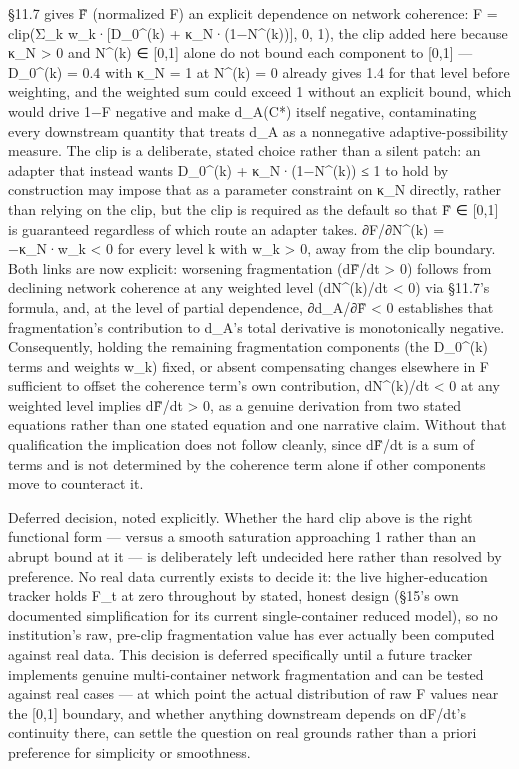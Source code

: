 \documentclass[
]{article}
\begin{document}
§11.7 gives F̃ (normalized F) an explicit dependence on network
coherence: F = clip(Σ\_k w\_k·{[}D\_0\^{}(k) + κ\_N·(1−N\^{}(k)){]}, 0,
1), the clip added here because κ\_N \textgreater{} 0 and N\^{}(k) ∈
{[}0,1{]} alone do not bound each component to {[}0,1{]} --- D\_0\^{}(k)
= 0.4 with κ\_N = 1 at N\^{}(k) = 0 already gives 1.4 for that level
before weighting, and the weighted sum could exceed 1 without an
explicit bound, which would drive 1−F negative and make d\_A(C*) itself
negative, contaminating every downstream quantity that treats d\_A as a
nonnegative adaptive-possibility measure. The clip is a deliberate,
stated choice rather than a silent patch: an adapter that instead wants
D\_0\^{}(k) + κ\_N·(1−N\^{}(k)) ≤ 1 to hold by construction may impose
that as a parameter constraint on κ\_N directly, rather than relying on
the clip, but the clip is required as the default so that F̃ ∈ {[}0,1{]}
is guaranteed regardless of which route an adapter takes. ∂F/∂N\^{}(k) =
−κ\_N·w\_k \textless{} 0 for every level k with w\_k \textgreater{} 0,
away from the clip boundary. Both links are now explicit: worsening
fragmentation (dF̃/dt \textgreater{} 0) follows from declining network
coherence at any weighted level (dN\^{}(k)/dt \textless{} 0) via §11.7's
formula, and, at the level of partial dependence, ∂d\_A/∂F̃ \textless{} 0
establishes that fragmentation's contribution to d\_A's total derivative
is monotonically negative. Consequently, holding the remaining
fragmentation components (the D\_0\^{}(k) terms and weights w\_k) fixed,
or absent compensating changes elsewhere in F sufficient to offset the
coherence term's own contribution, dN\^{}(k)/dt \textless{} 0 at any
weighted level implies dF̃/dt \textgreater{} 0, as a genuine derivation
from two stated equations rather than one stated equation and one
narrative claim. Without that qualification the implication does not
follow cleanly, since dF̃/dt is a sum of terms and is not determined by
the coherence term alone if other components move to counteract it.

Deferred decision, noted explicitly. Whether the hard clip above is the
right functional form --- versus a smooth saturation approaching 1
rather than an abrupt bound at it --- is deliberately left undecided
here rather than resolved by preference. No real data currently exists
to decide it: the live higher-education tracker holds F\_t at zero
throughout by stated, honest design (§15's own documented simplification
for its current single-container reduced model), so no institution's
raw, pre-clip fragmentation value has ever actually been computed
against real data. This decision is deferred specifically until a future
tracker implements genuine multi-container network fragmentation and can
be tested against real cases --- at which point the actual distribution
of raw F values near the {[}0,1{]} boundary, and whether anything
downstream depends on dF/dt's continuity there, can settle the question
on real grounds rather than a priori preference for simplicity or
smoothness.
\end{document}
